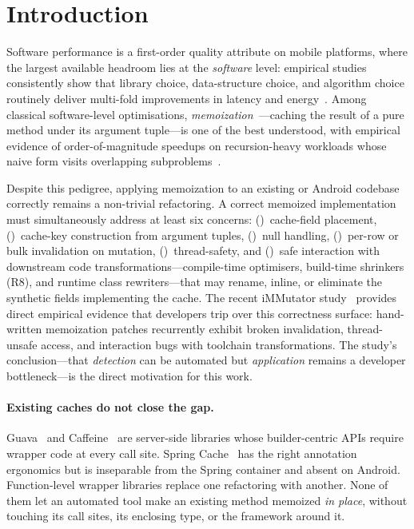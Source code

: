 \section{Introduction}\label{sec:intro}

Software performance is a first-order quality attribute on mobile platforms, where the largest available headroom lies at the \emph{software} level: empirical studies consistently show that library choice, data-structure choice, and algorithm choice routinely deliver multi-fold improvements in latency and energy~\cite{patterns,reduce_bytecode_energy,marco_refactorings_wild,empirical_rua}. Among classical software-level optimisations, \emph{memoization}~\cite{michie1968memo}---caching the result of a pure method under its argument tuple---is one of the best understood, with empirical evidence of order-of-magnitude speedups on recursion-heavy workloads whose naive form visits overlapping subproblems~\cite{hall_memoization,costa_memoization,immutator}.

Despite this pedigree, applying memoization to an existing \jvm or Android codebase correctly remains a non-trivial refactoring. A correct memoized implementation must simultaneously address at least six concerns: ()~cache-field placement, ()~cache-key construction from argument tuples, ()~null handling, ()~per-row or bulk invalidation on mutation, ()~thread-safety, and ()~safe interaction with downstream code transformations---compile-time optimisers, build-time shrinkers (R8), and runtime class rewriters---that may rename, inline, or eliminate the synthetic fields implementing the cache. The recent iMMutator study~\cite{immutator} provides direct empirical evidence that developers trip over this correctness surface: hand-written memoization patches recurrently exhibit broken invalidation, thread-unsafe access, and interaction bugs with toolchain transformations. The study's conclusion---that \emph{detection} can be automated but \emph{application} remains a developer bottleneck---is the direct motivation for this work.

\paragraph{Existing caches do not close the gap.} Guava~\cite{guava} and Caffeine~\cite{caffeine} are server-side libraries whose builder-centric APIs require wrapper code at every call site. Spring Cache~\cite{spring_cache} has the right annotation ergonomics but is inseparable from the Spring container and absent on Android. Function-level wrapper libraries replace one refactoring with another. None of them let an automated tool make an existing method memoized \emph{in place}, without touching its call sites, its enclosing type, or the framework around it.

